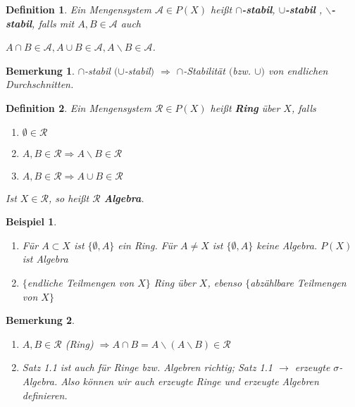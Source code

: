 \documentclass[11pt]{memoir}
\theoremstyle{changebreak}
\newtheorem{Definition}{Definition}[chapter]
\newtheorem{Bemerkung}{Bemerkung}[chapter]
\newtheorem{Beispiel}{Beispiel}[chapter]
\begin{document}
\begin{Definition}
Ein Mengensystem $\mathscr A \in P(X)$ heißt \textbf{$\cap$-stabil}, \textbf{ $\cup$-stabil }, \textbf{$\backslash$-stabil}, falls mit $A, B \in \mathscr A$ auch 
\begin{center}
	$A \cap B \in \mathscr A, A \cup B \in \mathscr A, A\backslash B \in \mathscr A$.
\end{center}
\end{Definition}

\begin{Bemerkung}
$\cap$-stabil $(\cup$-stabil$)$ $\Rightarrow$ $\cap$-Stabilität $($bzw. $\cup)$ von endlichen Durchschnitten.
\end{Bemerkung}

\begin{Definition}
Ein Mengensystem $\mathscr R \in P(X)$ heißt \textbf{Ring} über $X$, falls
\begin{enumerate}
	\item $\emptyset \in \mathscr R$
	\item $A, B \in \mathscr R \Rightarrow A\backslash B \in \mathscr R$
	\item $A, B \in \mathscr R \Rightarrow A \cup B \in \mathscr R$
\end{enumerate}
Ist $X \in \mathscr R$, so heißt $\mathscr R$ \textbf{Algebra}.
\end{Definition}


\begin{Beispiel}
\begin{enumerate}
	\item Für $A \subset X$ ist $\{\emptyset, A\}$ ein Ring. Für $A \ne X$ ist $\{\emptyset, A\}$ keine Algebra. $P(X)$ ist Algebra
	\item $\{$endliche Teilmengen von $X\}$ Ring über $X$, ebenso $\{ $abzählbare Teilmengen von $X\}$
\end{enumerate}
\end{Beispiel}

\begin{Bemerkung}
\begin{enumerate}
	\item $A, B \in \mathscr R$ (Ring) $\Rightarrow A \cap B = A \backslash (A \backslash B) \in \mathscr R$
	 \item Satz 1.1 ist auch für Ringe bzw. Algebren richtig; Satz 1.1 $\rightarrow$ erzeugte $\sigma$-Algebra. Also können wir auch erzeugte Ringe und erzeugte Algebren definieren.
\end{enumerate}
\end{Bemerkung}
\end{document}
